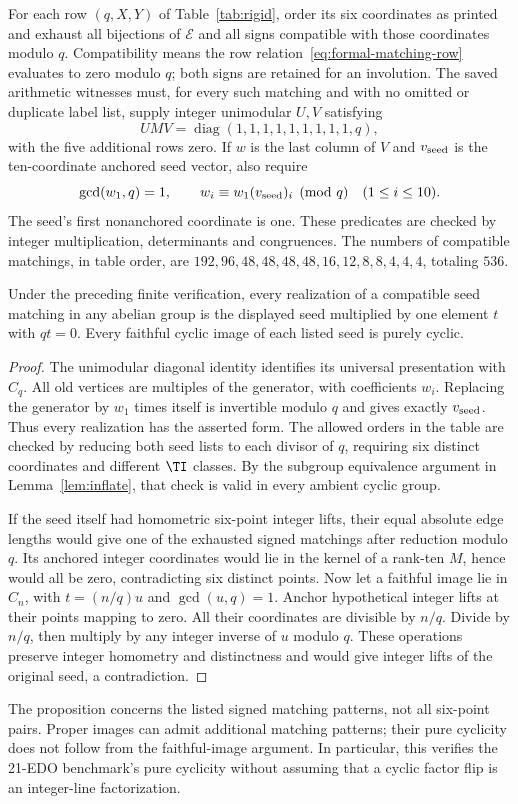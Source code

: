 For each row $(q,X,Y)$ of Table~\ref{tab:rigid}, order its six coordinates
as printed and exhaust all bijections of $\mathcal E$ and all signs
compatible with those coordinates modulo $q$. Compatibility means the
row relation~\eqref{eq:formal-matching-row} evaluates to zero modulo $q$;
both signs are retained for an involution. The saved arithmetic witnesses
must, for every such matching and with no omitted or duplicate label list,
supply integer unimodular $U,V$ satisfying
\[
 UMV=\operatorname{diag}(1,1,1,1,1,1,1,1,1,q),
\]
with the five additional rows zero. If $w$ is the last column of $V$ and
$v_{\rm seed}$ is the ten-coordinate anchored seed vector, also require
\[
 \gcd(w_1,q)=1,\qquad w_i\equiv w_1(v_{\rm seed})_i\pmod q
 \quad(1\le i\le10).
\]
The seed's first nonanchored coordinate is one. These predicates are
checked by integer multiplication, determinants and congruences. The
numbers of compatible matchings, in table order, are
$192,96,48,48,48,48,16,12,8,8,4,4,4$, totaling $536$.

\begin{proposition}
Under the preceding finite verification, every realization of a compatible
seed matching in any abelian group is the displayed seed multiplied by
one element $t$ with $qt=0$. Every faithful cyclic image of each listed
seed is purely cyclic.
\end{proposition}
\begin{proof}
The unimodular diagonal identity identifies its universal presentation
with $C_q$. All old vertices are multiples of the generator, with
coefficients $w_i$. Replacing the generator by $w_1$ times itself is
invertible modulo $q$ and gives exactly $v_{\rm seed}$. Thus every
realization has the asserted form. The allowed orders in the table are
checked by reducing both seed lists to each divisor of $q$, requiring
six distinct coordinates and different $\TI$ classes. By the subgroup
equivalence argument in Lemma~\ref{lem:inflate}, that check is valid in
every ambient cyclic group.

If the seed itself had homometric six-point integer lifts, their equal
absolute edge lengths would give one of the exhausted signed matchings
after reduction modulo $q$. Its anchored integer coordinates would lie
in the kernel of a rank-ten $M$, hence would all be zero, contradicting
six distinct points. Now let a faithful image lie in $C_n$, with
$t=(n/q)u$ and $\gcd(u,q)=1$. Anchor hypothetical integer lifts at their
points mapping to zero. All their coordinates are divisible by $n/q$.
Divide by $n/q$, then multiply by any integer inverse of $u$ modulo $q$.
These operations preserve integer homometry and distinctness and would
give integer lifts of the original seed, a contradiction.
\end{proof}

The proposition concerns the listed signed matching patterns, not all
six-point pairs. Proper images can admit additional matching patterns;
their pure cyclicity does not follow from the faithful-image argument.
In particular, this verifies the 21-EDO benchmark's pure cyclicity without
assuming that a cyclic factor flip is an integer-line factorization.
